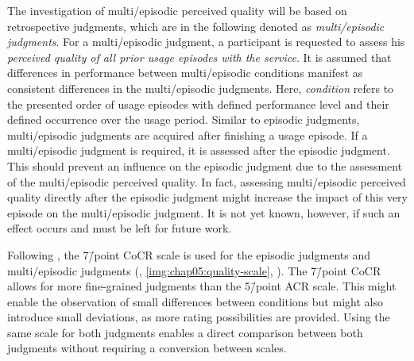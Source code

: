 The investigation of multi\-/episodic perceived quality will be based on retrospective judgments, which are in the following denoted as \emph{multi\-/episodic judgments}.
For a multi\-/episodic judgment, a participant is requested to assess his \emph{perceived quality of all prior usage episodes with the service}.
It is assumed that differences in performance between multi\-/episodic conditions manifest as consistent differences in the multi\-/episodic judgments.
Here, \emph{condition} refers to the presented order of usage episodes with defined performance level and their defined occurrence over the usage period.
Similar to episodic judgments, multi\-/episodic judgments are acquired after finishing a usage episode.
If a multi\-/episodic judgment is required, it is assessed after the episodic judgment.
This should prevent an influence on the episodic judgment due to the assessment of the multi\-/episodic perceived quality.
In fact, assessing multi\-/episodic perceived quality directly after the episodic judgment might increase the impact of this very episode on the multi\-/episodic judgment.
It is not yet known, however, if such an effect occurs and must be left for future work.

Following \citet{moller_single-call_2011}, the 7\=/point \acf{CoCR} scale is used for the episodic judgments and multi\-/episodic judgments (\cf, \autoref{img:chap05:quality-scale}, ).
The 7\=/point \ac{CoCR} allows for more fine-grained judgments than the 5\=/point \ac{ACR} scale.
This might enable the observation of small differences between conditions but might also introduce small deviations, as more rating possibilities are provided.
Using the same scale for both judgments enables a direct comparison between both judgments without requiring a conversion between scales.

